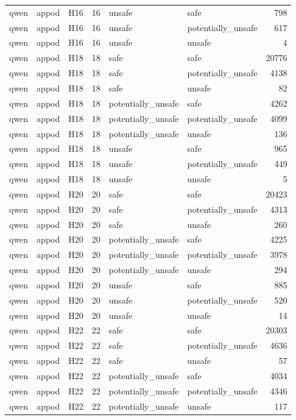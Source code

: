 \begin{table}[tbp]
\begin{tabular}{lllrllr}
qwen & appod & H16 & 16 & unsafe & safe & 798 \\
qwen & appod & H16 & 16 & unsafe & potentially\_unsafe & 617 \\
qwen & appod & H16 & 16 & unsafe & unsafe & 4 \\
qwen & appod & H18 & 18 & safe & safe & 20776 \\
qwen & appod & H18 & 18 & safe & potentially\_unsafe & 4138 \\
qwen & appod & H18 & 18 & safe & unsafe & 82 \\
qwen & appod & H18 & 18 & potentially\_unsafe & safe & 4262 \\
qwen & appod & H18 & 18 & potentially\_unsafe & potentially\_unsafe & 4099 \\
qwen & appod & H18 & 18 & potentially\_unsafe & unsafe & 136 \\
qwen & appod & H18 & 18 & unsafe & safe & 965 \\
qwen & appod & H18 & 18 & unsafe & potentially\_unsafe & 449 \\
qwen & appod & H18 & 18 & unsafe & unsafe & 5 \\
qwen & appod & H20 & 20 & safe & safe & 20423 \\
qwen & appod & H20 & 20 & safe & potentially\_unsafe & 4313 \\
qwen & appod & H20 & 20 & safe & unsafe & 260 \\
qwen & appod & H20 & 20 & potentially\_unsafe & safe & 4225 \\
qwen & appod & H20 & 20 & potentially\_unsafe & potentially\_unsafe & 3978 \\
qwen & appod & H20 & 20 & potentially\_unsafe & unsafe & 294 \\
qwen & appod & H20 & 20 & unsafe & safe & 885 \\
qwen & appod & H20 & 20 & unsafe & potentially\_unsafe & 520 \\
qwen & appod & H20 & 20 & unsafe & unsafe & 14 \\
qwen & appod & H22 & 22 & safe & safe & 20303 \\
qwen & appod & H22 & 22 & safe & potentially\_unsafe & 4636 \\
qwen & appod & H22 & 22 & safe & unsafe & 57 \\
qwen & appod & H22 & 22 & potentially\_unsafe & safe & 4034 \\
qwen & appod & H22 & 22 & potentially\_unsafe & potentially\_unsafe & 4346 \\
qwen & appod & H22 & 22 & potentially\_unsafe & unsafe & 117 \\

\end{tabular}
\end{table}
